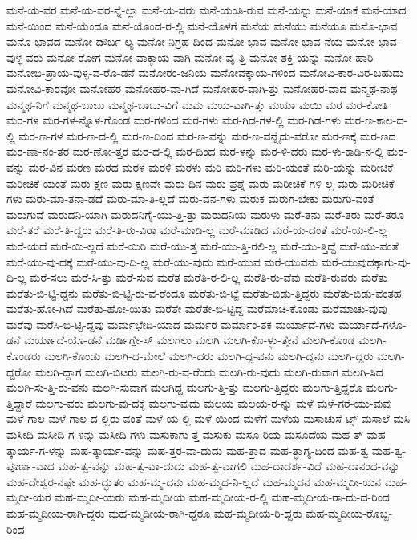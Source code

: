 {ಮನೆ-ಯ-ವರ
ಮನೆ-ಯ-ವರ-ನ್ನೆ-ಲ್ಲಾ
ಮನೆ-ಯ-ವರು
ಮನೆ-ಯಂತಿ-ರುವ
ಮನೆ-ಯನ್ನು
ಮನೆ-ಯಾಕೆ
ಮನೆ-ಯಾದ
ಮನೆ-ಯಿಂದ
ಮನೆ-ಯೆಂದೂ
ಮನೆ-ಯೊಂದ-ರ-ಲ್ಲಿ
ಮನೆ-ಯೊಳಗೆ
ಮನೆಯ
ಮನೆಯು
ಮನೆಯೂ
ಮನೊ-ಭಾವ
ಮನೊ-ಭಾವದ
ಮನೋ-ದೌರ್ಬ-ಲ್ಯ
ಮನೋ-ನಿಗ್ರಹ-ದಿಂದ
ಮನೋ-ಭಾವ
ಮನೋ-ಭಾವ-ನೆಯ
ಮನೋ-ಭಾವ-ವುಳ್ಳ-ವರು
ಮನೋ-ರೋಗ
ಮನೋ-ವಾಕ್ಕಾಯ-ವಾಗಿ
ಮನೋ-ವೃ-ತ್ತಿ
ಮನೋ-ಶಕ್ತಿ-ಯನ್ನು
ಮನೋ-ಹಾರಿ
ಮನೋಭಿ-ಪ್ರಾಯ-ವುಳ್ಳ-ವ-ರೊ-ಡನೆ
ಮನೋರಂ-ಜನಿಯ
ಮನೋವಕ್ಕಾಯ-ಗಳಿಂದ
ಮನೋವಿ-ಕಾರ-ವಿರ-ಬಹುದು
ಮನೋವಿ-ಕಾರವೋ
ಮನೋಹರ
ಮನೋಹರ-ವಾ-ಗಿದೆ
ಮನೋಹರ-ವಾಗಿ-ತ್ತು
ಮನೋಹರ-ವಾದ
ಮನ್ಮಥ-ನಾಥ
ಮನ್ಮಥ-ನಿಗೆ
ಮನ್ಮಥ-ಬಾಬು
ಮನ್ಮಥ-ಬಾಬು-ವಿಗೆ
ಮಮ
ಮಯ-ವಾಗಿ-ತ್ತು
ಮಯಾ
ಮಯಿ
ಮರ
ಮರ-ಕೋತಿ
ಮರ-ಗಳ
ಮರ-ಗಳ-ನ್ನೊಳ-ಗೊಂಡ
ಮರ-ಗಳಿಂದ
ಮರ-ಗಳು
ಮರ-ಗಿಡ-ಗಳ-ಲ್ಲಿ
ಮರ-ಗಿಡ-ಗಳು
ಮರ-ಣ-ಕಾಲ-ದ-ಲ್ಲಿ
ಮರ-ಣ-ಗಳ
ಮರ-ಣ-ದ-ಲ್ಲಿ
ಮರ-ಣ-ದಿಂದ
ಮರ-ಣ-ವನ್ನು
ಮರ-ಣ-ವನ್ನೈದು-ವರೋ
ಮರ-ಣಕ್ಕೆ
ಮರ-ಣದ
ಮರ-ಣಾ-ನಂ-ತರ
ಮರ-ಣೋ-ತ್ತರ
ಮರ-ದ-ಲ್ಲಿ
ಮರ-ದಿಂದ
ಮರ-ಳನ್ನು
ಮರ-ಳಿ-ದರು
ಮರ-ಳು-ಕಾಡಿ-ನ-ಲ್ಲಿ
ಮರ-ವನ್ನು
ಮರ-ವಿನ
ಮರಣ
ಮರದ
ಮರಳ
ಮರಳಿ
ಮರಳು
ಮರಿ
ಮರಿ-ಗಳು
ಮರಿ-ಯಂತೆ
ಮರಿ-ಯನ್ನು
ಮರೀಚಿಕೆ
ಮರೀಚಿಕೆ-ಯಂತೆ
ಮರು-ಕ್ಷಣ
ಮರು-ಕ್ಷಣವೇ
ಮರು-ದಿನ
ಮರು-ಪ್ರಶ್ನೆ
ಮರು-ಮರೀಚಿಕೆ-ಗಳಿ-ಲ್ಲ
ಮರು-ಮರೀಚಿಕೆ-ಗಳು
ಮರು-ಮಾ-ತನಾ-ಡದೆ
ಮರು-ಮಾ-ತಿ-ಲ್ಲದೆ
ಮರು-ವನ-ಗಳು
ಮರುಕ
ಮರುಗ-ಬೇಕು
ಮರುಗು-ವಂತೆ
ಮರುಗುವೆ
ಮರುದನಿ-ಯಾಗಿ
ಮರುದನಿಗೈ-ಯು-ತ್ತಿ-ತ್ತು
ಮರುದನಿಯ
ಮರುಳು
ಮರೆ-ತನು
ಮರೆ-ತರು
ಮರೆ-ತರೂ
ಮರೆ-ತರೆ
ಮರೆ-ತಿ-ದ್ದರು
ಮರೆ-ತಿ-ರು-ವಿರಾ
ಮರೆ-ಮಾಡಿ-ಲ್ಲ
ಮರೆ-ಮಾಡಿದ
ಮರೆ-ಯ-ದಂತೆ
ಮರೆ-ಯ-ಲಿ-ಲ್ಲ
ಮರೆ-ಯದೆ
ಮರೆ-ಯಿ-ಲ್ಲದೆ
ಮರೆ-ಯಿರಿ
ಮರೆ-ಯು-ತ್ತ
ಮರೆ-ಯು-ತ್ತಿ-ರಲಿ-ಲ್ಲ
ಮರೆ-ಯು-ತ್ತಿದ್ದೆ
ಮರೆ-ಯು-ವಂತೆ
ಮರೆ-ಯು-ವು-ದಕ್ಕೆ
ಮರೆ-ಯು-ವು-ದಿ-ಲ್ಲ
ಮರೆ-ಯು-ವುದು
ಮರೆ-ಯುವ
ಮರೆ-ಯುವನು
ಮರೆ-ಯುವುದಕ್ಕಾಗು-ವು-ದಿ-ಲ್ಲ
ಮರೆ-ಸಲು
ಮರೆ-ಸಿ-ತ್ತು
ಮರೆ-ಸುವ
ಮರೆತ
ಮರೆತಿ-ರ-ಲಿ-ಲ್ಲ
ಮರೆತಿ-ರು-ವೆವು
ಮರೆತಿ-ರುವರು
ಮರೆತು
ಮರೆತು-ಬಿ-ಟ್ಟಿ-ದ್ದನು
ಮರೆತು-ಬಿ-ಟ್ಟಿ-ರು-ವ-ರೆಂದೂ
ಮರೆತು-ಬಿ-ಟ್ಟೆ
ಮರೆತು-ಬಿಡು-ತ್ತಿದ್ದರು
ಮರೆತು-ಬಿಡು-ವಂತಹ
ಮರೆತು-ಹೋ-ಗಿದೆ
ಮರೆತು-ಹೋ-ಯಿತು
ಮರೆತೇ
ಮರೆತೇ-ಬಿ-ಟ್ಟಿದ್ದ
ಮರೆಮಾಚಿ-ಕೊಂಡು
ಮರೆಮಾಚು-ವುವು
ಮರೆವು
ಮರೆಸಿ-ಬಿ-ಟ್ಟಿ-ದ್ದವು
ಮರ್ಮಭೇದಿ-ಯಾದ
ಮರ್ಮರ
ಮರ್ಮಾಂ-ತಕ
ಮರ್ಯಾದೆ-ಗಳು
ಮರ್ಯಾದೆ-ಗಳೊ-ಡನೆ
ಮರ್ಯಾದೆ-ಯೊ-ಡನೆ
ಮರ್ಡಿಗ್ಲೇ-ಸ್
ಮಲಗಲು
ಮಲಗಿ
ಮಲಗಿ-ಕೊ-ಳ್ಳು-ತ್ತೇನೆ
ಮಲಗಿ-ಕೊಂಡ
ಮಲಗಿ-ಕೊಂಡರು
ಮಲಗಿ-ಕೊಂಡು
ಮಲಗಿ-ದ-ಮೇಲೆ
ಮಲಗಿ-ದರು
ಮಲಗಿ-ದ್ದ-ವನು
ಮಲಗಿ-ದ್ದನು
ಮಲಗಿ-ದ್ದರು
ಮಲಗಿ-ದ್ದರೋ
ಮಲಗಿ-ದ್ದಾಗ
ಮಲಗಿ-ಬಿಟರು
ಮಲಗಿ-ರು-ವ-ರೆಂದು
ಮಲಗಿ-ರು-ವುದು
ಮಲಗಿ-ರುವಾಗ
ಮಲಗಿ-ಸಿದ
ಮಲಗಿ-ಸು-ತ್ತಿ-ರು-ವನು
ಮಲಗಿ-ಸುವಾಗ
ಮಲಗಿದ್ದ
ಮಲಗು-ತ್ತಿ-ತ್ತು
ಮಲಗು-ತ್ತಿದ್ದರು
ಮಲಗು-ತ್ತಿದ್ದರೊ
ಮಲಗು-ತ್ತಿದ್ದಾರೆ
ಮಲಗು-ವರು
ಮಲಗು-ವು-ದಕ್ಕೆ
ಮಲಗು-ವುದು
ಮಲಯ
ಮಲಯ-ರ-ನ್ನು
ಮಳೆ
ಮಳೆ-ಗರೆ-ಯು-ವುವು
ಮಳೆ-ಗಾಲ
ಮಳೆ-ಗಾಲ-ದ-ಲ್ಲಿರು-ವಂತೆ
ಮಳೆ-ಯ-ಲ್ಲಿ
ಮಳೆ-ಯಿಂದ
ಮಳೆಗೆ
ಮಳೆಯ
ಮಸಾಚುಸೆ-ಟ್ಸ್
ಮಸಾಲೆ
ಮಸಿ
ಮಸೀದಿ
ಮಸೀದಿ-ಗ-ಳನ್ನು
ಮಸೀದಿ-ಗಳು
ಮಸುಕಾಗು-ತ್ತ
ಮಸುಕು
ಮಸೂ-ರಿಯ
ಮಸೂದೆಯ
ಮಹ-ತ್
ಮಹ-ತ್ಕಾರ್ಯ-ಗ-ಳನ್ನು
ಮಹ-ತ್ಕಾರ್ಯ-ವನ್ನು
ಮಹ-ತ್ತರ-ವಾ-ದುದು
ಮಹ-ತ್ತಾದ
ಮಹ-ತ್ಭಾಗ್ಯ-ದಿಂದ
ಮಹ-ತ್ವ
ಮಹ-ತ್ವ-ಪೂರ್ಣ-ವಾದ
ಮಹ-ತ್ವ-ವನ್ನು
ಮಹ-ತ್ವ-ವಾ-ದುದು
ಮಹ-ತ್ವ-ವಾಗಲಿ
ಮಹ-ದಾದರ್ಶ-ವಿದೆ
ಮಹ-ದಾನಂದ-ವನ್ನು
ಮಹ-ದೇಶ್ವರ-ನಷ್ಟೇ
ಮಹ-ದ್ಭುತಂ
ಮಹ-ಮ್ಮ-ದನು
ಮಹ-ಮ್ಮದ-ನಿ-ಲ್ಲದೆ
ಮಹ-ಮ್ಮದನ
ಮಹ-ಮ್ಮದೀ-ಯನ
ಮಹ-ಮ್ಮದೀ-ಯರ
ಮಹ-ಮ್ಮದೀ-ಯರು
ಮಹ-ಮ್ಮದೀಯ
ಮಹ-ಮ್ಮದೀಯ-ರ-ಲ್ಲಿ
ಮಹ-ಮ್ಮದೀಯ-ರಾ-ದು-ದ-ರಿಂದ
ಮಹ-ಮ್ಮದೀಯ-ರಾಗಿ-ದ್ದರು
ಮಹ-ಮ್ಮದೀಯ-ರಾಗಿ-ದ್ದರೂ
ಮಹ-ಮ್ಮದೀಯ-ರಿ-ದ್ದರು
ಮಹ-ಮ್ಮದೀಯ-ರೊಬ್ಬ-ರಿಂದ
}
